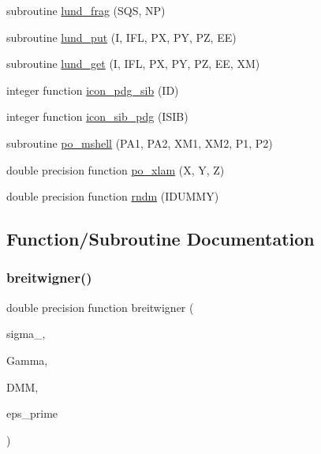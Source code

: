 \begin{DoxyCompactItemize}
\item 
subroutine \hyperlink{sophia_8f_aa2514852059ffefd5e81067e0416b369}{lund\+\_\+frag} (S\+QS, NP)
\item 
subroutine \hyperlink{sophia_8f_a0d3735098c482b58d34ec7c94184d48c}{lund\+\_\+put} (I, I\+FL, PX, PY, PZ, EE)
\item 
subroutine \hyperlink{sophia_8f_a60e0415dfc0daee02345071f23c94998}{lund\+\_\+get} (I, I\+FL, PX, PY, PZ, EE, XM)
\item 
integer function \hyperlink{sophia_8f_a3928d8a7bc2ce08d3775703b5831b357}{icon\+\_\+pdg\+\_\+sib} (ID)
\item 
integer function \hyperlink{sophia_8f_a7f231f6a007b991d5bd222def346230a}{icon\+\_\+sib\+\_\+pdg} (I\+S\+IB)
\item 
subroutine \hyperlink{sophia_8f_ad5081f8ab8f8bcc8b16cd0d624b89eb9}{po\+\_\+mshell} (P\+A1, P\+A2, X\+M1, X\+M2, P1, P2)
\item 
double precision function \hyperlink{sophia_8f_ad9860632b53c4102f75afb65ab08ce14}{po\+\_\+xlam} (X, Y, Z)
\item 
double precision function \hyperlink{sophia_8f_aed998ddeef674b380ab46e12a16db0bc}{rndm} (I\+D\+U\+M\+MY)
\end{DoxyCompactItemize}


\subsection{Function/\+Subroutine Documentation}
\mbox{\label{sophia_8f_ae462dd618b46569b99e29cf52b615206}} 
\subsubsection{\texorpdfstring{breitwigner()}{breitwigner()}}
{\footnotesize\ttfamily double precision function breitwigner (\begin{DoxyParamCaption}\item[{}]{sigma\+\_,  }\item[{}]{Gamma,  }\item[{}]{D\+MM,  }\item[{}]{eps\+\_\+prime }\end{DoxyParamCaption})}

\mbox{\label{sophia_8f_aba3e49e88d500c8ca82839c874166cfb}} 
